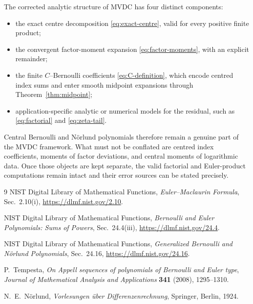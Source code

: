 \documentclass[11pt,a4paper]{article}
\begin{document}
The corrected analytic structure of MVDC has four distinct components:
\par\smallskip
\begin{itemize}
  \item the exact centre decomposition \eqref{eq:exact-centre}, valid for
        every positive finite product;
  \item the convergent factor-moment expansion
        \eqref{eq:factor-moments}, with an explicit remainder;
  \item the finite \(C\)--Bernoulli coefficients
        \eqref{eq:C-definition}, which encode centred index sums and
        enter smooth midpoint expansions through
        Theorem~\ref{thm:midpoint};
  \item application-specific analytic or numerical models for the
        residual, such as \eqref{eq:factorial} and
        \eqref{eq:zeta-tail}.
\end{itemize}
Central Bernoulli and Nörlund polynomials therefore remain a genuine
part of the MVDC framework.  What must not be conflated are centred
index coefficients, moments of factor deviations, and central moments
of logarithmic data.  Once those objects are kept separate, the valid
factorial and Euler-product computations remain intact and their error
sources can be stated precisely.

\begin{thebibliography}{9}
NIST Digital Library of Mathematical Functions,
\emph{Euler--Maclaurin Formula}, Sec.~2.10(i),
\url{https://dlmf.nist.gov/2.10}.

NIST Digital Library of Mathematical Functions,
\emph{Bernoulli and Euler Polynomials: Sums of Powers}, Sec.~24.4(iii),
\url{https://dlmf.nist.gov/24.4}.

NIST Digital Library of Mathematical Functions,
\emph{Generalized Bernoulli and Nörlund Polynomials}, Sec.~24.16,
\url{https://dlmf.nist.gov/24.16}.

P.~Tempesta,
\emph{On Appell sequences of polynomials of Bernoulli and Euler type},
\emph{Journal of Mathematical Analysis and Applications}
\textbf{341} (2008), 1295--1310.

N.~E.~Nörlund,
\emph{Vorlesungen über Differenzenrechnung},
Springer, Berlin, 1924.
\end{thebibliography}
\end{document}
